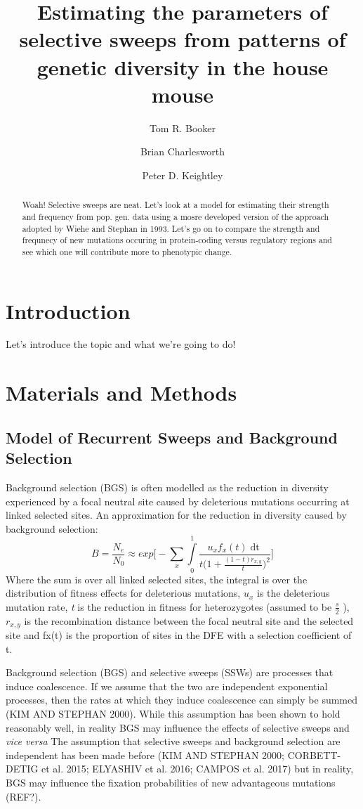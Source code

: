 \documentclass{article}
\title{Estimating the parameters of selective sweeps from patterns of genetic diversity in the house mouse}
\author[1,*]{Tom R. Booker}
\author[1]{Brian Charlesworth}
\author[1]{Peter D. Keightley}
\affil[1]{Institute of Evolutionary Biology, University of Edinburgh, Edinburgh}
\affil[*]{\emph{t.r.booker@sms.ed.ac.uk}}
\begin{document}
\maketitle
\begin{abstract}
Woah! Selective sweeps are neat. Let's look at a model for estimating their strength and frequency from pop. gen. data using a mosre developed version of the approach adopted by Wiehe and Stephan in 1993. Let's go on to compare the strength and frequnecy of new mutations occuring in protein-coding versus regulatory regions and see which one will contribute more to phenotypic change.

\end{abstract}

\section*{Introduction}
Let's introduce the topic and what we're going to do!

\section*{Materials and Methods}

	\subsection*{Model of Recurrent Sweeps and Background Selection}
Background selection (BGS) is often modelled as the reduction in diversity experienced by a focal neutral site caused by deleterious mutations occurring at linked selected sites. An approximation for the reduction in diversity caused by background selection:
\begin{equation}
B = \frac{N_{e}}{N_{0}} \approx exp\Bigg[- \sum \limits_{x} \int \limits_{0}^1 \frac{u_{x}f_x(t)\mathop{dt}}{t \Big( 1 + \frac{(1-t)r_{x,y}}{t} \Big)^2} \Bigg]
\end{equation}
Where the sum is over all linked selected sites, the integral is over the distribution of fitness effects for deleterious mutations, \emph{$u_{x}$} is the deleterious mutation rate, \emph{t} is the reduction in fitness for heterozygotes (assumed to be \(\frac{s}{2}\) ), $r_{x,y}$  is the recombination distance between the focal neutral site and the selected site and fx(t) is the proportion of sites in the DFE with a selection coefficient of t.

	Background selection (BGS) and selective sweeps (SSWs) are processes that induce coalescence. If we assume that the two are independent exponential processes, then the rates at which they induce coalescence can simply be summed (KIM AND STEPHAN 2000). While this assumption has been shown to hold reasonably well, in reality BGS may influence the effects of selective sweeps and \emph{vice versa}
	The assumption that selective sweeps and background selection are independent has been made before (KIM AND STEPHAN 2000; CORBETT-DETIG et al. 2015; ELYASHIV et al. 2016; CAMPOS et al. 2017) but in reality, BGS may influence the fixation probabilities of new advantageous mutations (REF?). 
\end{document}

